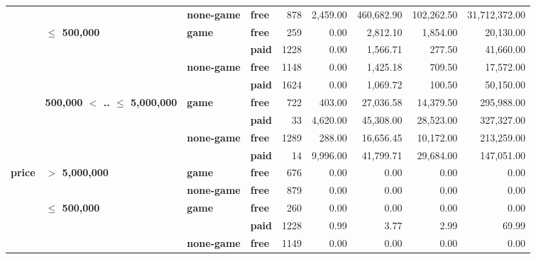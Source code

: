 \begin{tabular}{llll|rrrrr}
      &                                 & \textbf{none-game} & \textbf{free} &    878 & 2,459.00 & 460,682.90 & 102,262.50 & 31,712,372.00 \\
\cline{2-9}
      & \multirow{4}{*}{\textbf{$\leq$ 500,000}} & \multirow{2}{*}{\textbf{game}} & \textbf{free} &    259 &     0.00 &   2,812.10 &   1,854.00 &     20,130.00 \\
      &                                 &           & \textbf{paid} &   1228 &     0.00 &   1,566.71 &     277.50 &     41,660.00 \\
\cline{3-9}
      &                                 & \multirow{2}{*}{\textbf{none-game}} & \textbf{free} &   1148 &     0.00 &   1,425.18 &     709.50 &     17,572.00 \\
      &                                 &           & \textbf{paid} &   1624 &     0.00 &   1,069.72 &     100.50 &     50,150.00 \\
\cline{2-9}
\cline{3-9}
      & \multirow{4}{*}{\textbf{500,000 $<$ .. $\leq$ 5,000,000}} & \multirow{2}{*}{\textbf{game}} & \textbf{free} &    722 &   403.00 &  27,036.58 &  14,379.50 &    295,988.00 \\
      &                                 &           & \textbf{paid} &     33 & 4,620.00 &  45,308.00 &  28,523.00 &    327,327.00 \\
\cline{3-9}
      &                                 & \multirow{2}{*}{\textbf{none-game}} & \textbf{free} &   1289 &   288.00 &  16,656.45 &  10,172.00 &    213,259.00 \\
      &                                 &           & \textbf{paid} &     14 & 9,996.00 &  41,799.71 &  29,684.00 &    147,051.00 \\
\cline{1-9}
\cline{2-9}
\cline{3-9}
\multirow{10}{*}{\textbf{price}} & \multirow{2}{*}{\textbf{$>$ 5,000,000}} & \textbf{game} & \textbf{free} &    676 &     0.00 &       0.00 &       0.00 &          0.00 \\
      &                                 & \textbf{none-game} & \textbf{free} &    879 &     0.00 &       0.00 &       0.00 &          0.00 \\
\cline{2-9}
      & \multirow{4}{*}{\textbf{$\leq$ 500,000}} & \multirow{2}{*}{\textbf{game}} & \textbf{free} &    260 &     0.00 &       0.00 &       0.00 &          0.00 \\
      &                                 &           & \textbf{paid} &   1228 &     0.99 &       3.77 &       2.99 &         69.99 \\
\cline{3-9}
      &                                 & \multirow{2}{*}{\textbf{none-game}} & \textbf{free} &   1149 &     0.00 &       0.00 &       0.00 &          0.00 \\

\end{tabular}
